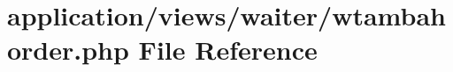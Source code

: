 \hypertarget{wtambahorder_8php}{}\section{application/views/waiter/wtambahorder.php File Reference}
\label{wtambahorder_8php}
